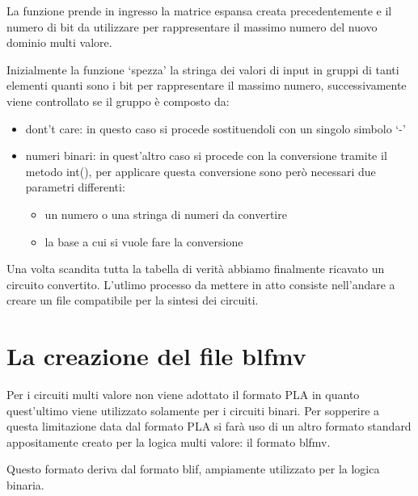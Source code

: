 \documentclass[]{book}
\providecommand{\tightlist}{%
  \setlength{\itemsep}{0pt}\setlength{\parskip}{0pt}}
\begin{document}
La funzione prende in ingresso la matrice espansa creata precedentemente e il numero di bit da utilizzare per rappresentare il massimo numero del nuovo dominio multi valore.

\newpage

Inizialmente la funzione `spezza' la stringa dei valori di input in gruppi di tanti elementi quanti sono i bit per rappresentare il massimo numero, successivamente viene controllato se il gruppo è composto da:

\begin{itemize}
\tightlist
\item
  dont't care: in questo caso si procede sostituendoli con un singolo simbolo `-'
\item
  numeri binari: in quest'altro caso si procede con la conversione tramite il metodo int(), per applicare questa conversione sono però necessari due parametri differenti:

  \begin{itemize}
  \tightlist
  \item
    un numero o una stringa di numeri da convertire
  \item
    la base a cui si vuole fare la conversione
  \end{itemize}
\end{itemize}

Una volta scandita tutta la tabella di verità abbiamo finalmente ricavato un circuito convertito. L'utlimo processo da mettere in atto consiste nell'andare a creare un file compatibile per la sintesi dei circuiti.

\hypertarget{la-creazione-del-file-blfmv}{%
\section{La creazione del file blfmv}\label{la-creazione-del-file-blfmv}}

Per i circuiti multi valore non viene adottato il formato PLA in quanto quest'ultimo viene utilizzato solamente per i circuiti binari. Per sopperire a questa limitazione data dal formato PLA si farà uso di un altro formato standard appositamente creato per la logica multi valore: il formato blfmv.

Questo formato deriva dal formato blif, ampiamente utilizzato per la logica binaria.
\end{document}
